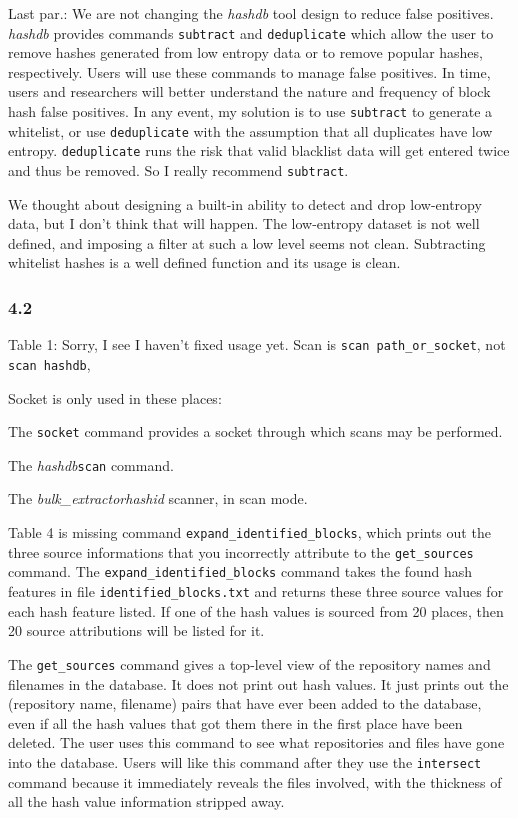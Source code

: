 \documentclass[12pt,twoside]{article}
\newcommand{\hdb}{\emph{hashdb}\xspace}
\newcommand{\bulk}{\emph{bulk\_extractor}\xspace}
\newcommand{\hid}{\emph{hashid}\xspace}
\begin{document}
Last par.:
We are not changing the \hdb tool design to reduce false positives.
\hdb provides commands \texttt{subtract} and \texttt{deduplicate}
which allow the user to remove hashes generated from low entropy data
or to remove popular hashes, respectively.
Users will use these commands to manage false positives.
In time, users and researchers will better understand the nature and frequency
of block hash false positives.
In any event, my solution is to use \texttt{subtract} to generate a whitelist,
or use \texttt{deduplicate}
with the assumption that all duplicates have low entropy.
\texttt{deduplicate} runs the risk that valid blacklist data will get entered
twice and thus be removed.
So I really recommend \texttt{subtract}.

We thought about designing a built-in ability
to detect and drop low-entropy data,
but I don't think that will happen.
The low-entropy dataset is not well defined,
and imposing a filter at such a low level seems not clean.
Subtracting whitelist hashes is a well defined function and its usage is clean.

\subsubsection*{4.2}
Table 1:
Sorry, I see I haven't fixed usage yet.
Scan is \texttt{scan path\_or\_socket},
not \texttt{scan hashdb},

Socket is only used in these places:
\begin{compactitem}
\item The \texttt{socket} command provides a socket
through which scans may be performed.
\item The \hdb \texttt{scan} command.
\item The \bulk \hid scanner, in scan mode.
\end{compactitem}

Table 4 is missing command \texttt{expand\_identified\_blocks},
which prints out the three source informations
that you incorrectly attribute to the \texttt{get\_sources} command.
The \texttt{expand\_identified\_blocks} command
takes the found hash features in file \texttt{identified\_blocks.txt}
and returns these three source values for each hash feature listed.
If one of the hash values is sourced from 20 places, then 20 source attributions
will be listed for it.

The \texttt{get\_sources} command gives a top-level view
of the repository names and filenames in the database.
It does not print out hash values.
It just prints out the (repository name, filename) pairs
that have ever been added to the database,
even if all the hash values that got them there in the first place
have been deleted.
The user uses this command to see what repositories and files
have gone into the database.
Users will like this command after they use the \texttt{intersect} command
because it immediately reveals the files involved,
with the thickness of all the hash value information stripped away.
\end{document}
